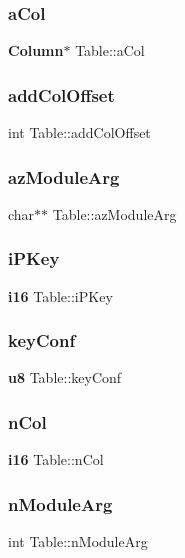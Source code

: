 \subsubsection{aCol}
{\footnotesize\ttfamily \textbf{ Column}$\ast$ Table\+::a\+Col}

\mbox{\label{struct_table_ab6f1ad10bce5c20faca55cd0a9c3f1ff}} 
\subsubsection{addColOffset}
{\footnotesize\ttfamily int Table\+::add\+Col\+Offset}

\mbox{\label{struct_table_af3af6596efa41894bcd3c3c9f9b6781f}} 
\subsubsection{azModuleArg}
{\footnotesize\ttfamily char$\ast$$\ast$ Table\+::az\+Module\+Arg}

\mbox{\label{struct_table_af5e592498393a990cb1344555fa86409}} 
\subsubsection{iPKey}
{\footnotesize\ttfamily \textbf{ i16} Table\+::i\+P\+Key}

\mbox{\label{struct_table_add1b22425db781d976d25b4465a2965a}} 
\subsubsection{keyConf}
{\footnotesize\ttfamily \textbf{ u8} Table\+::key\+Conf}

\mbox{\label{struct_table_a1a8346811ba23fdfd90c5b54076bbefb}} 
\subsubsection{nCol}
{\footnotesize\ttfamily \textbf{ i16} Table\+::n\+Col}

\mbox{\label{struct_table_a74a2c5547ea876ebe77dbea0d99361bf}} 
\subsubsection{nModuleArg}
{\footnotesize\ttfamily int Table\+::n\+Module\+Arg}

